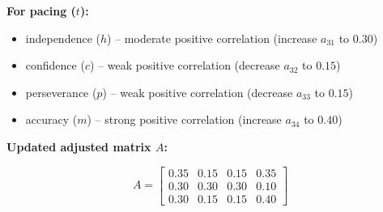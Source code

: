 \documentclass{article}
\begin{document}
        \textbf{For pacing ($t$):}
        \begin{itemize}
	        \item independence ($h$) – moderate positive correlation (increase $a_{31}$ to $0.30$)
	        \item confidence ($c$) – weak positive correlation (decrease $a_{32}$ to $0.15$)
	        \item perseverance ($p$) – weak positive correlation (decrease $a_{33}$ to $0.15$)
	        \item accuracy ($m$) – strong positive correlation (increase $a_{34}$ to $0.40$)
        \end{itemize}

        \textbf{Updated adjusted matrix $A$:}

        \[
            A = \begin{bmatrix} 
                0.35 & 0.15 & 0.15 & 0.35 \\
                0.30 & 0.30 & 0.30 & 0.10 \\
                0.30 & 0.15 & 0.15 & 0.40
            \end{bmatrix}
        \]
\end{document}

